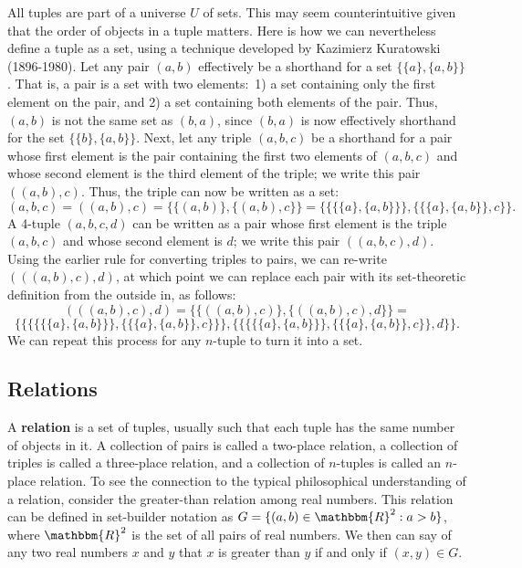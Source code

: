 \documentclass[11pt]{article}
\theoremstyle{definition}
\theoremstyle{remark}
\begin{document}
All tuples are part of a universe $U$ of sets. This may seem counterintuitive given that the order of objects in a tuple matters. Here is how we can nevertheless define a tuple as a set, using a technique developed by Kazimierz Kuratowski (1896-1980). Let any pair $(a,b)$ effectively be a shorthand for a set $\{\{a\},\{a,b\}\}$. That is, a pair is a set with two elements:\ 1) a set containing only the first element on the pair, and 2) a set containing both elements of the pair. Thus, $(a,b)$ is not the same set as $(b,a)$, since $(b,a)$ is now effectively shorthand for the set $\{\{b\},\{a,b\}\}$. Next, let any triple $(a,b,c)$ be a shorthand for a pair whose first element is the pair containing the first two elements of $(a,b,c)$ and whose second element is the third element of the triple; we write this pair $((a,b),c)$. Thus, the triple can now be written as a set:
$$(a,b,c)=((a,b),c)=\{\{(a,b)\},\{(a,b),c\}\}=\{\{\{\{a\},\{a,b\}\}\},\{\{\{a\},\{a,b\}\},c\}\}.$$
A 4-tuple $(a,b,c,d)$ can be written as a pair whose first element is the triple $(a,b,c)$ and whose second element is $d$; we write this pair $((a,b,c),d)$. Using the earlier rule for converting triples to pairs, we can re-write $(((a,b),c),d)$, at which point we can replace each pair with its set-theoretic definition from the outside in, as follows:
$$(((a,b),c),d)=\{\{((a,b),c)\},\{((a,b),c),d\}\}=$$
$$\{\{\{\{\{\{a\},\{a,b\}\}\},\{\{\{a\},\{a,b\}\},c\}\}\},\{\{\{\{\{a\},\{a,b\}\}\},\{\{\{a\},\{a,b\}\},c\}\},d\}\}.$$
We can repeat this process for any $n$-tuple to turn it into a set.\par 

\subsection{Relations}
A \textbf{relation} is a set of tuples, usually such that each tuple has the same number of objects in it. A collection of pairs is called a two-place relation, a collection of triples is called a three-place relation, and a collection of $n$-tuples is called an $n$-place relation. To see the connection to the typical philosophical understanding of a relation, consider the greater-than relation among real numbers. This relation can be defined in set-builder notation as $G = \{(a,b)\in\mathbbm{R}^{2} : a>b\}$, where $\mathbbm{R}^{2}$ is the set of all pairs of real numbers. We then can say of any two real numbers $x$ and $y$ that $x$ is greater than $y$ if and only if $(x,y)\in G$. 
\end{document}

